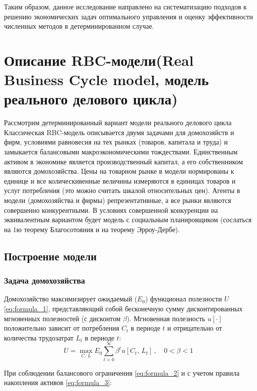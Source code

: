 \documentclass[a4paper,12pt]{article}
\begin{document}
{Таким образом, данное исследование направлено на систематизацию подходов к решению экономических задач оптимального управления и оценку эффективности численных методов в детерминированном случае.

}



\section{Описание RBC-модели(Real Business Cycle model, модель реального делового цикла)}
{\fontsize{14pt}{20pt}\selectfont Рассмотрим детерминированный вариант модели реального делового цикла
Классическая RBC-модель описывается двумя задачами для домохозяйств и фирм, условиями равновесия на тех рынках (товаров, капитала и труда) и замыкается балансовыми макроэкономическими тождествами. Единственным активом в экономике является производственный капитал, а его собственником являются домохозяйства. Цены на товарном рынке в модели нормированы к единице и все колическивенные величины измеряются в единицах товаров и услуг потребления (это можно считать шкалой относительных цен).
Агенты в модели (домохозяйства и фирмы) репрезентативные, а все рынки являются совершенно конкурентными. В условиях совершенной конкуренции на эквивалентным вариантом будет модель с социальным планировщиком (сослаться на 1ю теорему Благосотояния и на теорему Эрроу-Дербе).

\subsection{Построение модели}
\subsubsection{Задача домохозяйства}
Домохозяйство максимизирует ожидаемый ($E_0$) функционал полезности $U$ \eqref{eq:formula_1}, представляющий собой бесконечную сумму дисконтированных мгновенных полезностей (с дисконтом $\beta$). Мгновенная полезность $u[\cdot]$ положительно зависит от потребления $C_t$ в периоде $t$ и отрицательно от количества трудозатрат $L_t$ в периоде $t$:
\begin{equation}
U = \max_{C, \, L} E_0 \sum_{t=0}^{\infty} \beta^t u[C_t, \, L_t] \, , \quad 0 < \beta < 1 
\label{eq:formula_1}
\end{equation}

При соблюдении балансового ограничения \eqref{eq:formula_2} и с учетом правила накопления активов \eqref{eq:formula_3}:

}
\end{document}
